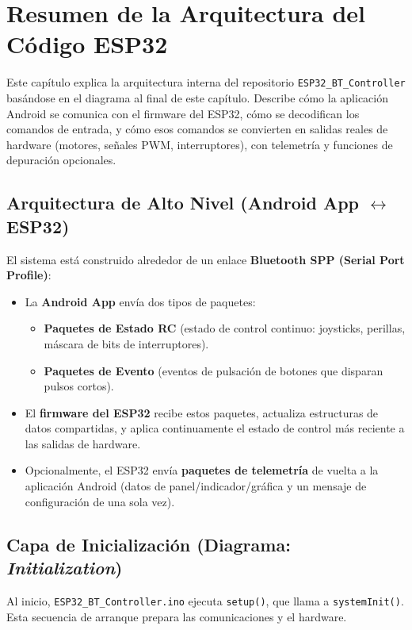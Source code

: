 \chapter{Resumen de la Arquitectura del Código ESP32}

Este capítulo explica la arquitectura interna del repositorio \texttt{ESP32\_BT\_Controller} basándose en el diagrama al final de este capítulo.
Describe cómo la aplicación Android se comunica con el firmware del ESP32, cómo se decodifican los comandos de entrada,
y cómo esos comandos se convierten en salidas reales de hardware (motores, señales PWM, interruptores), con telemetría y funciones de depuración opcionales.

\section{Arquitectura de Alto Nivel (Android App \texorpdfstring{$\leftrightarrow$}{<->} ESP32)}

El sistema está construido alrededor de un enlace \textbf{Bluetooth SPP (Serial Port Profile)}:

\begin{itemize}
    \item La \textbf{Android App} envía dos tipos de paquetes:
    \begin{itemize}
        \item \textbf{Paquetes de Estado RC} (estado de control continuo: joysticks, perillas, máscara de bits de interruptores).
        \item \textbf{Paquetes de Evento} (eventos de pulsación de botones que disparan pulsos cortos).
    \end{itemize}
    \item El \textbf{firmware del ESP32} recibe estos paquetes, actualiza estructuras de datos compartidas, y aplica continuamente el
    estado de control más reciente a las salidas de hardware.
    \item Opcionalmente, el ESP32 envía \textbf{paquetes de telemetría} de vuelta a la aplicación Android (datos de panel/indicador/gráfica y un mensaje de configuración de una sola vez).
\end{itemize}

\section{Capa de Inicialización (Diagrama: \textit{Initialization})}

Al inicio, \texttt{ESP32\_BT\_Controller.ino} ejecuta \texttt{setup()}, que llama a \texttt{systemInit()}.
Esta secuencia de arranque prepara las comunicaciones y el hardware.

